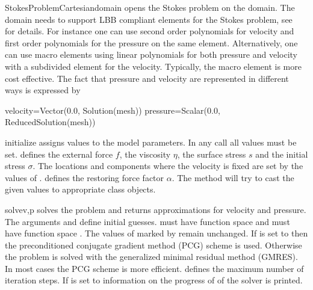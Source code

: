 \begin{classdesc}{StokesProblemCartesian}{domain}
opens the Stokes problem on the \Domain domain.
The domain needs to support LBB compliant elements for the Stokes problem, see~\cite{LBB} for details.
For instance one can use second order polynomials for velocity and first order
polynomials for the pressure on the same element.
Alternatively, one can use macro elements using linear
polynomials for both pressure and velocity with a subdivided element for the
velocity. Typically, the macro element is more cost effective.
The fact that pressure and velocity are represented in different ways is
expressed by
\begin{python}
  velocity=Vector(0.0, Solution(mesh))
  pressure=Scalar(0.0, ReducedSolution(mesh))
\end{python}
\end{classdesc}

\begin{methoddesc}[StokesProblemCartesian]{initialize}{}
assigns values to the model parameters. In any call all values must be set.
 defines the external force $f$,  the viscosity $\eta$,
 the surface stress $s$ and  the initial stress $\sigma$.
The locations and components where the velocity is fixed are set by the values
of .
 defines the restoring force factor $\alpha$.
The method will try to cast the given values to appropriate \Data class objects.
\end{methoddesc}

\begin{methoddesc}[StokesProblemCartesian]{solve}{v,p
}
solves the problem and returns approximations for velocity and pressure. 
The arguments  and  define initial guesses.
 must have function space  and  must have
function space .
The values of  marked by  remain unchanged.
If  is set to \True then the preconditioned conjugate gradient
method (PCG) scheme is
used. Otherwise the problem is solved with the generalized minimal residual
method (GMRES).
In most cases the PCG scheme is more efficient.
 defines the maximum number of iteration steps.
If  is set to \True information on the progress of of the solver
is printed.
\end{methoddesc}

